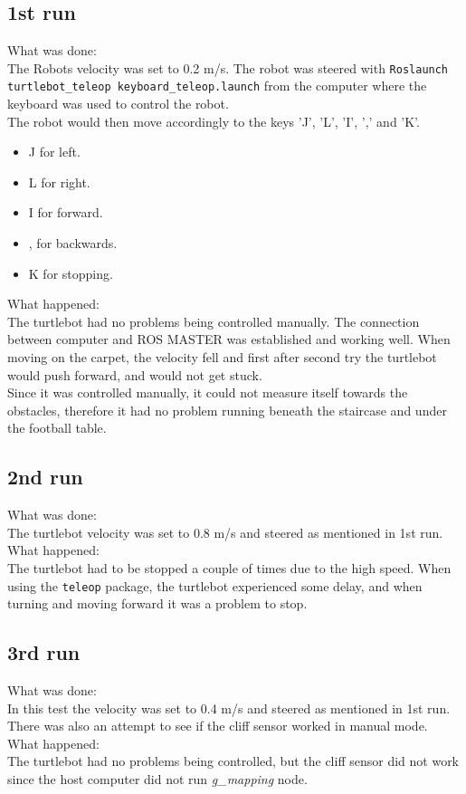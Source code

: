 \subsection{1st run}
What was done:\\ 
The Robots velocity was set to 0.2 m/s. The robot was steered with \texttt{Roslaunch turtlebot\_teleop keyboard\_teleop.launch} from the computer where the keyboard was used to control the robot.\\
The robot would then move accordingly to the keys 'J', 'L', 'I', ',' and 'K'.
\begin{itemize}
    \item J for left.
    \item L for right.
    \item I for forward.
    \item , for backwards.
    \item K for stopping.
\end{itemize}
What happened:\\
The turtlebot had no problems being controlled manually. The connection between computer and ROS MASTER was established and working well. When moving on the carpet, the velocity fell and first after second try the turtlebot would push forward, and would not get stuck.\\
Since it was controlled manually, it could not measure itself towards the obstacles, therefore it had no problem running beneath the staircase and under the football table. 

\subsection{2nd run}
What was done:\\
The turtlebot velocity was set to 0.8 m/s and steered as mentioned in 1st run.\\
What happened:\\
The turtlebot  had to be stopped a couple of times due to the high speed. When using the \texttt{teleop} package, the turtlebot experienced some delay, and when turning and moving forward it was a problem to stop.\\

\subsection{3rd run}
What was done: \\
In this test the velocity was set to 0.4 m/s and steered as mentioned in 1st run. There was also an attempt to see if the cliff sensor worked in manual mode.\\
What happened:\\
The turtlebot had no problems being controlled, but the cliff sensor did not work since the host computer did not run \textit{g\_mapping} node. 

